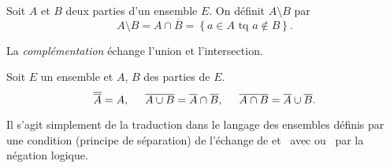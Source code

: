 \begin{defi}
  Soit $A$ et $B$ deux parties d'un ensemble $E$. On définit $A \setminus B$ par
\[
  A \setminus B = A \cap \overline{B} = \left\lbrace a\in A \text{ tq } a\notin B \right\rbrace .
\]
\end{defi}
La \emph{complémentation} échange l'union et l'intersection.
\begin{prop}
  Soit $E$ un ensemble et $A$, $B$ des parties de $E$.
\[
  \overline{\overline{A}} = A,\hspace{0.5cm} \overline{A \cup B} = \overline{A} \cap \overline{B}
  ,\hspace{0.5cm} \overline{A \cap B} = \overline{A} \cup \overline{B}.
\]
\end{prop}
\begin{demo}
Il s'agit simplement de la traduction dans le langage des ensembles définis par une condition (principe de séparation) de l'échange de \og et\fg~ avec \og ou\fg~ par la  négation logique.
\end{demo}

